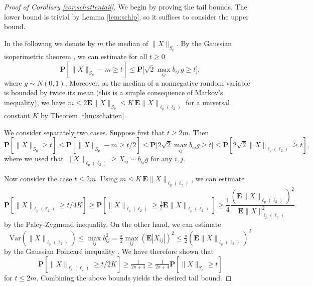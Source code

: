 \documentclass[10pt,reqno]{amsart}
\theoremstyle{definition}
\numberwithin{equation}{section}
\numberwithin{figure}{section}
\numberwithin{table}{section}
\begin{document}
\begin{proof}[Proof of Corollary \ref{cor:schattentail}]
We begin by proving the tail bounds. The lower bound is trivial by
Lemma \ref{lem:schlp}, so it suffices to consider the upper bound.

In the following we denote by $m$ the median of $\|X\|_{S_p}$. By the 
Gaussian isoperimetric theorem \cite[Theorem 10.17]{BLM13}, we can 
estimate for all $t\ge 0$
$$
	\mathbf{P}[\|X\|_{S_p}-m\ge t] \le
	\mathbf{P}\bigg[\sqrt{2}\max_{ij}b_{ij}\,g\ge t\bigg],
$$
where $g\sim N(0,1)$. Moreover, as the median of a nonnegative random 
variable is bounded by twice its mean (this is a simple consequence of 
Markov's inequality), we have $m\le 2\mathbf{E}\|X\|_{S_p}\le 
K\,\mathbf{E}\|X\|_{\ell_p(\ell_2)}$ for a universal constant $K$ by 
Theorem \ref{thm:schatten}.

We consider separately two cases. Suppose first that $t\ge 2m$. Then
$$
	\mathbf{P}[\|X\|_{S_p} \ge t] \le
	\mathbf{P}[\|X\|_{S_p} - m \ge t/2] \le
	\mathbf{P}\bigg[2\sqrt{2} \max_{ij}b_{ij}g \ge t\bigg] \le
	\mathbf{P}[2\sqrt{2}\|X\|_{\ell_p(\ell_2)}\ge t],
$$
where we used that $\|X\|_{\ell_p(\ell_2)}\ge X_{ij}\sim b_{ij}g$ for any 
$i,j$.

Now consider the case $t\le 2m$. Using $m\le 
K\,\mathbf{E}\|X\|_{\ell_p(\ell_2)}$, we can estimate
$$
	\mathbf{P}[\|X\|_{\ell_p(\ell_2)} \ge t/4K] \ge
	\mathbf{P}[\|X\|_{\ell_p(\ell_2)} \ge 
	\tfrac{1}{2}\mathbf{E}\|X\|_{\ell_p(\ell_2)}] \ge
	\frac{1}{4}\frac{(\mathbf{E}\|X\|_{\ell_p(\ell_2)})^2}{
	\mathbf{E}\|X\|_{\ell_p(\ell_2)}^2}
$$
by the Paley-Zygmund inequality. On the other hand, we can estimate
$$
	\mathrm{Var}(\|X\|_{\ell_p(\ell_2)})\le \max_{ij}b_{ij}^2 
	= \tfrac{\pi}{2}\max_{ij}(\mathbf{E}|X_{ij}|)^2
	\le
	\tfrac{\pi}{2}(\mathbf{E}\|X\|_{\ell_p(\ell_2)})^2
$$
by the Gaussian Poincar\'e inequality \cite[Theorem 3.20]{BLM13}.
We have therefore shown that 
$$
	\mathbf{P}[\|X\|_{\ell_p(\ell_2)} \ge t/2K] \ge
	\tfrac{1}{2\pi+4} \ge
	\tfrac{1}{2\pi+4}\mathbf{P}[\|X\|_{S_p}\ge t]
$$
for $t\le 2m$. Combining the above bounds yields the desired tail bound.


\end{proof}
\end{document}
